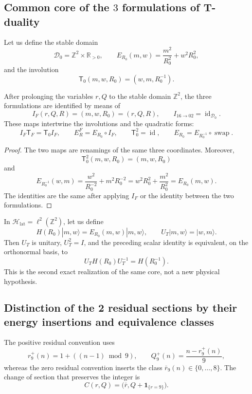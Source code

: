 \subsection{Common core of the \(3\) formulations of T-duality}

Let us define the stable domain
\[
 \mathscr D_0=\mathbb Z^2\times\mathbb R_{>0},
 \qquad
 E_{R_0}(m,w)=\frac{m^2}{R_0^2}+w^2R_0^2,
\]
and the involution
\[
 \mathsf T_0(m,w,R_0)=(w,m,R_0^{-1}).
\]

\begin{theorem}
\label{thm:cierre-vtm-tres-formulaciones-t}
After prolonging the variables \(r,Q\) to the stable domain
\(\mathbb Z^2\), the three formulations are identified by means of
\[
 I_F(r,Q,R)=(m,w,R_0)=(r,Q,R),
 \qquad I_{16\to02}=\operatorname{id}_{\mathscr D_0}.
\]
These maps intertwine the involutions and the quadratic forms:
\[
 I_F\mathsf T_F=\mathsf T_0I_F,
 \qquad
 E_R^F=E_{R_0}\circ I_F,
 \qquad
 \mathsf T_0^2=\operatorname{id},
 \qquad
 E_{R_0}=E_{R_0^{-1}}\circ\operatorname{swap}.
\]
\end{theorem}

\begin{proof}
The two maps are renamings of the same three coordinates. Moreover,
\[
 \mathsf T_0^2(m,w,R_0)=(m,w,R_0)
\]
and
\[
 E_{R_0^{-1}}(w,m)
 =\frac{w^2}{R_0^{-2}}+m^2R_0^{-2}
 =w^2R_0^2+\frac{m^2}{R_0^2}
 =E_{R_0}(m,w).
\]
The identities are the same after applying \(I_F\) or the identity between the
two formulations.
\end{proof}

In \(\mathcal H_{\mathrm{lat}}=\ell^2(\mathbb Z^2)\), let us define
\[
 H(R_0)|m,w\rangle=E_{R_0}(m,w)|m,w\rangle,
 \qquad U_T|m,w\rangle=|w,m\rangle.
\]
Then \(U_T\) is unitary, \(U_T^2=I\), and the preceding scalar identity
is equivalent, on the orthonormal basis, to
\[
 \boxed{U_TH(R_0)U_T^{-1}=H(R_0^{-1}).}
\]
This is the second exact realization of the same core, not a new physical hypothesis.

\subsection{Distinction of the 2 residual sections by their energy insertions and equivalence classes}

The positive residual convention uses
\[
 r_9^+(n)=1+((n-1)\bmod9),
 \qquad Q_9^+(n)=\frac{n-r_9^+(n)}9,
\]
whereas the zero residual convention inserts the class
\(\bar r_9(n)\in\{0,\ldots,8\}\). The change of section that preserves the
integer is
\[
 C(r,Q)=\bigl(\bar r,Q+\mathbf1_{\{r=9\}}\bigr).
\]

